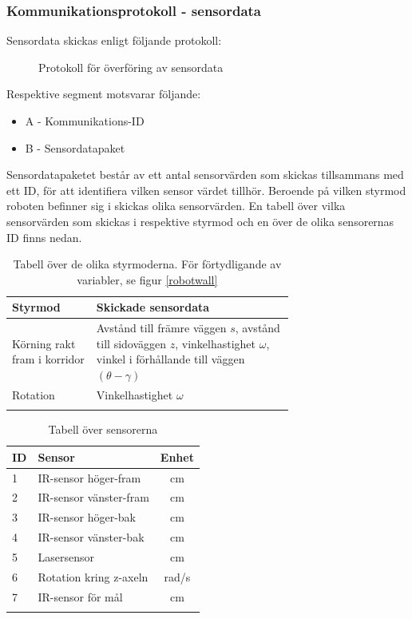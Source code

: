 \documentclass[11pt]{article}
\begin{document}
\begin{flushleft}
\subsubsection{Kommunikationsprotokoll - sensordata}
Sensordata skickas enligt följande protokoll:

 \begin{figure}[H]
\centering
\noindent\resizebox{.8\linewidth}{!}{
	}
	\caption{Protokoll för överföring av sensordata\label{sensordata}}	
\end{figure} 

Respektive segment motsvarar följande: 
\begin{itemize}
	\item A - Kommunikations-ID
	\item B - Sensordatapaket
\end{itemize}

Sensordatapaketet består av ett antal sensorvärden som skickas tillsammans med ett ID, för att identifiera vilken sensor värdet tillhör. Beroende på vilken styrmod roboten befinner sig i skickas olika sensorvärden. En tabell över vilka sensorvärden som skickas i respektive styrmod och en över de olika sensorernas ID finns nedan.

\begin{longtable}[l]{| l | p{0.7\linewidth} |} \hline
\textbf{Styrmod} & \textbf{Skickade sensordata} \\ \hline 
Körning rakt fram i korridor & Avstånd till främre väggen $s$, avstånd till sidoväggen $z$, vinkelhastighet $\omega$, vinkel i förhållande till väggen $(\theta-\gamma)$ \\ \hline
Rotation & Vinkelhastighet $\omega$ \\ \hline
\caption{Tabell över de olika styrmoderna. För förtydligande av variabler, se figur \ref{robotwall}}
\end{longtable}


\begin{longtable}[l]{| l | l | c |} \hline
\textbf{ID} & \textbf{Sensor} & \textbf{Enhet} \\ \hline 
1 & IR-sensor höger-fram & cm \\ \hline
2 & IR-sensor vänster-fram  & cm \\ \hline
3 & IR-sensor höger-bak  & cm  \\ \hline
4 & IR-sensor vänster-bak  &  cm \\ \hline
5 & Lasersensor & cm  \\ \hline
6 & Rotation kring z-axeln & rad/s \\ \hline
7 & IR-sensor för mål & cm \\ \hline
\caption{Tabell över sensorerna}\label{sensortab}
\end{longtable}


\end{flushleft}
\end{document}
